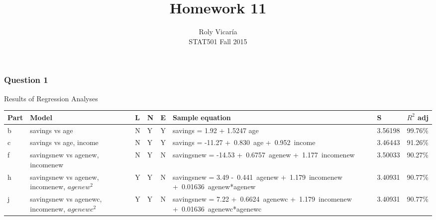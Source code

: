 \documentclass{article}
\title{Homework 11}
\author{Roly Vicar\'ia \\ STAT501 Fall 2015}
\begin{document}
    
    
    \maketitle
    
    

    
    \subsubsection{Question 1}\label{question-1}

    \begin{center}
Results of Regression Analyses
\end{center}

\begin{longtable}[c]{@{}lllllp{6cm}ll@{}}
\toprule
Part & Model & L & N & E & Sample equation
& S & \(R^2\) adj\tabularnewline
\midrule
\endhead
b & savings vs age & N & Y & Y & savings = 1.92 + 1.5247 age & 3.56198 &
99.76\%\tabularnewline
c & savings vs age, income & N & Y & Y & savings = -11.27 +~0.830~age
+~0.952~income & 3.46443 & 91.26\%\tabularnewline
f & savingsnew vs agenew, incomenew & N & Y & N & savingsnew = -14.53
+~0.6757~agenew +~1.177~incomenew & 3.50033 & 90.27\%\tabularnewline
h & savingsnew vs agenew, incomenew, \(agenew^2\) & Y & Y & N &
savingsnew = 3.49 -~0.441~agenew +~1.179~incomenew
+~0.01636~agenew*agenew & 3.40931 & 90.77\%\tabularnewline
j & savingsnew vs agenewc, incomenew, \(agenewc^2\) & Y & Y & N &
savingsnew = 7.22 +~0.6624~agenewc +~1.179~incomenew
+~0.01636~agenewc*agenewc & 3.40931 & 90.77\%\tabularnewline
\bottomrule
\end{longtable}
\end{document}
